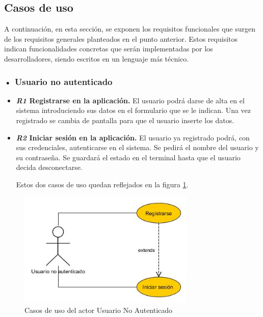 \subsection{Casos de uso}
A continuación, en esta sección, se exponen los requisitos funcionales que surgen de los requisitos generales planteados en el punto anterior. Estos requisitos indican funcionalidades concretas que serán implementadas por los desarrolladores, siendo escritos en un lenguaje más técnico.
\subsubsection{• Usuario no autenticado}
\begin{itemize}
\item\textbf{ \textit{R1}  Registrarse en la aplicación.}
 El usuario podrá darse de alta en el sistema
introduciendo sus datos en el formulario que se le indican. Una vez registrado se cambia de pantalla para que el usuario inserte los datos.

\item \textbf{\textit{R2} Iniciar sesión en la aplicación. }
El usuario ya registrado podrá, con
sus credenciales, autenticarse en el  sistema. Se pedirá el nombre del usuario y su contraseña. Se guardará el estado en el terminal hasta que el usuario decida desconectarse.

Estos dos casos de uso quedan reflejados en la figura \ref{fig:usuario-no-autenticado}.


\end{itemize} 
\begin{figure}
		\centering
		\includegraphics[width=0.75\textwidth] {usuario-no-autenticado.jpg}
		\caption{Casos de uso del actor Usuario No Autenticado }\label{fig:usuario-no-autenticado}
	\end{figure}
	
	
	
